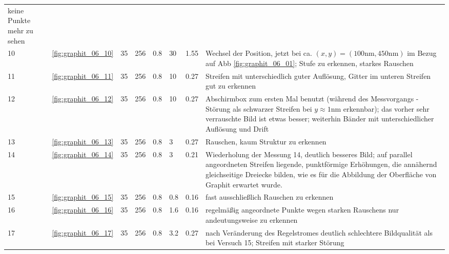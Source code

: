 \begin{tabular}{p{3pt} p{12pt} p{9pt} p{9pt} p{9pt} p{12pt} p{14pt} p{9cm}}
keine Punkte mehr zu sehen \\ 
10  & \ref{fig:graphit_06_10}& 35 & 256 & 0.8 &  30 & 1.55 & Wechsel der Position, jetzt bei 
ca. $(x, y) = (100\mathrm{nm}, 450\mathrm{nm})$ im Bezug auf Abb \ref{fig:graphit_06_01}; Stufe zu erkennen, 
starkes Rauschen \\
11  & \ref{fig:graphit_06_11}& 35 & 256 & 0.8 &  10 & 0.27 & Streifen mit unterschiedlich 
guter Auflösung, Gitter im unteren Streifen gut zu erkennen \\
12  & \ref{fig:graphit_06_12}& 35 & 256 & 0.8 &  10 & 0.27 & Abschirmbox zum ersten Mal benutzt 
(während des Messvorgangs - Störung als schwarzer Streifen bei $y \approx 1\mathrm{nm}$ 
erkennbar); das vorher sehr verrauschte Bild ist etwas besser; weiterhin Bänder mit 
unterschiedlicher Auflösung und Drift \\
13  & \ref{fig:graphit_06_13}& 35 & 256 & 0.8 &   3 & 0.27 & Rauschen, kaum Struktur zu 
erkennen\\ 
14  & \ref{fig:graphit_06_14}& 35 & 256 & 0.8 &   3 & 0.21 & Wiederholung der Messung 14, 
deutlich besseres Bild; auf parallel angeordneten Streifen liegende, punktförmige 
Erhöhungen, die annähernd gleichseitige Dreiecke bilden, wie es für die Abbildung der 
Oberfläche von Graphit erwartet wurde. \\ 
15  & \ref{fig:graphit_06_15}& 35 & 256 & 0.8 & 0.8 & 0.16 & fast ausschließlich Rauschen zu 
erkennen \\
16  & \ref{fig:graphit_06_16}& 35 & 256 & 0.8 & 1.6 & 0.16 & regelmäßig angeordnete Punkte 
wegen starken Rauschens nur andeutungsweise zu erkennen \\
17  & \ref{fig:graphit_06_17}& 35 & 256 & 0.8 & 3.2 & 0.27 & nach Veränderung des Regelstromes 
deutlich schlechtere Bildqualität als bei Versuch 15; Streifen mit starker Störung \\
\end{tabular}

